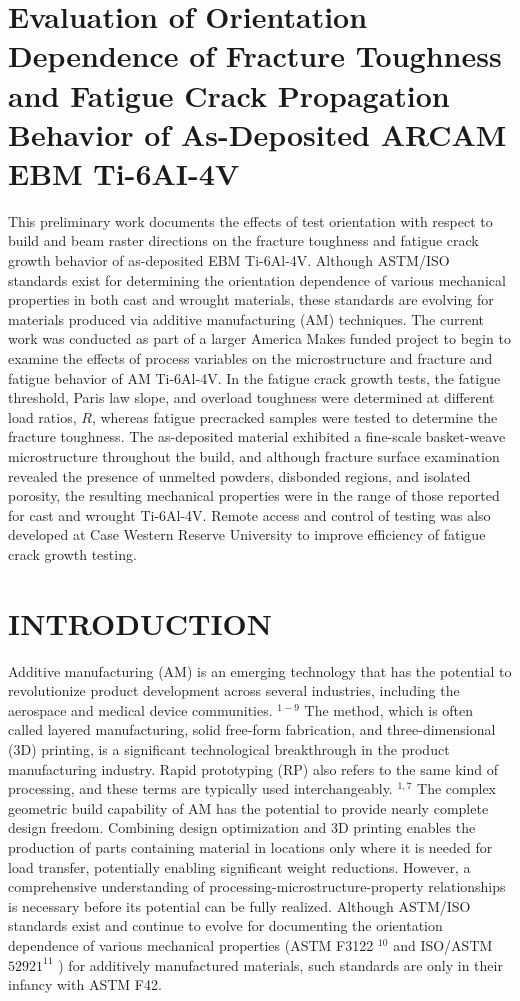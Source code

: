 \documentclass[10pt]{article}
\begin{document}
\section*{Evaluation of Orientation Dependence of Fracture Toughness and Fatigue Crack Propagation Behavior of As-Deposited ARCAM EBM Ti-6AI-4V }
This preliminary work documents the effects of test orientation with respect to build and beam raster directions on the fracture toughness and fatigue crack growth behavior of as-deposited EBM Ti-6Al-4V. Although ASTM/ISO standards exist for determining the orientation dependence of various mechanical properties in both cast and wrought materials, these standards are evolving for materials produced via additive manufacturing (AM) techniques. The current work was conducted as part of a larger America Makes funded project to begin to examine the effects of process variables on the microstructure and fracture and fatigue behavior of AM Ti-6Al-4V. In the fatigue crack growth tests, the fatigue threshold, Paris law slope, and overload toughness were determined at different load ratios, $R$, whereas fatigue precracked samples were tested to determine the fracture toughness. The as-deposited material exhibited a fine-scale basket-weave microstructure throughout the build, and although fracture surface examination revealed the presence of unmelted powders, disbonded regions, and isolated porosity, the resulting mechanical properties were in the range of those reported for cast and wrought Ti-6Al-4V. Remote access and control of testing was also developed at Case Western Reserve University to improve efficiency of fatigue crack growth testing.

\section*{INTRODUCTION}
Additive manufacturing (AM) is an emerging technology that has the potential to revolutionize product development across several industries, including the aerospace and medical device communities. ${ }^{1-9}$ The method, which is often called layered manufacturing, solid free-form fabrication, and three-dimensional (3D) printing, is a significant technological breakthrough in the product manufacturing industry. Rapid prototyping (RP) also refers to the same kind of processing, and these terms are typically used interchangeably. ${ }^{1,7}$ The complex geometric build capability of AM has the potential to provide nearly complete design freedom. Combining design optimization and 3D printing enables the production of parts containing material in locations only where it is needed for load transfer, potentially enabling significant weight reductions. However, a comprehensive understanding of processing-microstructure-property relationships is necessary before its potential can be fully realized. Although ASTM/ISO standards exist and continue to evolve for documenting the orientation dependence of various mechanical properties (ASTM F3122 ${ }^{10}$ and ISO/ASTM $52921^{11}$ ) for additively manufactured materials, such standards are only in their infancy with ASTM F42.
\end{document}
